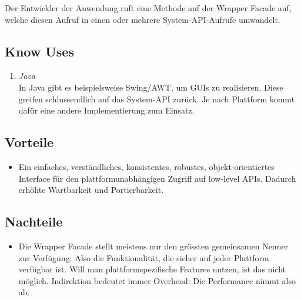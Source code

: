 Der Entwickler der Anwendung ruft eine Methode auf der Wrapper Facade auf, welche diesen Aufruf in einen oder mehrere System-API-Aufrufe umwandelt.


\subsection{Know Uses}

\begin{enumerate}
	\item \emph{Java}\\
	In Java gibt es beispielsweise Swing/AWT, um GUIs zu realisieren. Diese greifen schlussendlich auf das System-API zurück. Je nach Plattform kommt dafür eine andere Implementierung zum Einsatz.
\end{enumerate}


\subsection{Vorteile}

\begin{itemize}
	\item Ein einfaches, verständliches, konsistentes, robustes, objekt-orientiertes Interface für den plattformunabhängigen Zugriff auf low-level APIs. Dadurch erhöhte Wartbarkeit und Portierbarkeit.
\end{itemize}


\subsection{Nachteile}

\begin{itemize}
	\item Die Wrapper Facade stellt meistens nur den grössten gemeinsamen Nenner zur Verfügung: Also die Funktionalität, die sicher auf jeder Plattform verfügbar ist. Will man plattformspezifische Features nutzen, ist das nicht möglich. Indirektion bedeutet immer Overhead: Die Performance nimmt also ab.
\end{itemize}
